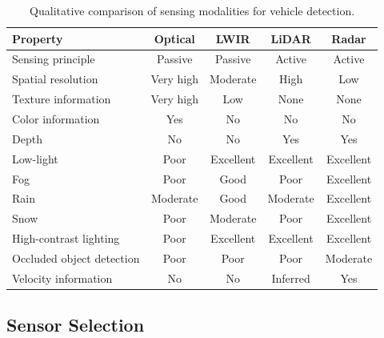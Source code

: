 \documentclass[12pt,oneside,bibtotoc,liststotoc]{scrbook}
\begin{document}
\begin{table}[H]
    \centering
    \caption{Qualitative comparison of sensing modalities for vehicle detection.}
    \label{tab:modality_comparison}
    \scriptsize
    \setlength{\tabcolsep}{8pt}
    \begin{tabular}{|lcccc|}
        \toprule
        \rowcolor{white}
        \textbf{Property}         & \textbf{Optical} & \textbf{LWIR} & \textbf{LiDAR} & \textbf{Radar} \\
        \midrule
        Sensing principle         & Passive          & Passive       & Active         & Active         \\
        Spatial resolution        & Very high        & Moderate      & High           & Low            \\
        Texture information       & Very high        & Low           & None           & None           \\
        Color information         & Yes              & No            & No             & No             \\
        Depth                     & No               & No            & Yes            & Yes            \\
        Low-light                 & Poor             & Excellent     & Excellent      & Excellent      \\
        Fog                       & Poor             & Good          & Poor           & Excellent      \\
        Rain                      & Moderate         & Good          & Moderate       & Excellent      \\
        Snow                      & Poor             & Moderate      & Poor           & Excellent      \\
        High-contrast lighting    & Poor             & Excellent     & Excellent      & Excellent      \\
        Occluded object detection & Poor             & Poor          & Poor           & Moderate       \\
        Velocity information      & No               & No            & Inferred       & Yes            \\
        \bottomrule
    \end{tabular}
\end{table}

\vspace{-1em}
\subsection{Sensor Selection}
\label{sec:sensor_selection}
\end{document}
